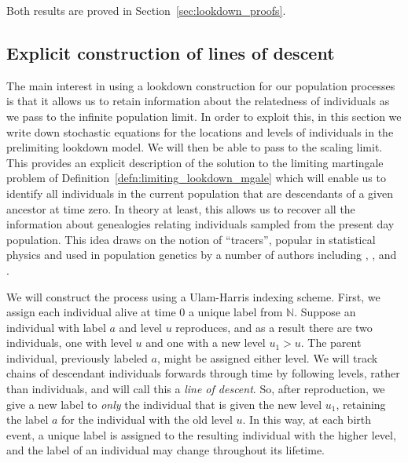 \documentclass[EJP]{ejpecp} %
\newcommand{\IN}{\mathbb N}
\newcommand{\citet}[1]{\cite{#1}}
\begin{document}
Both results are proved in Section~\ref{sec:lookdown_proofs}.

\subsection{Explicit construction of lines of descent}
    \label{sec: individual lines of descent}

 
The main interest in using a lookdown construction for our population
processes is that it allows us to retain information about the 
relatedness of individuals as we pass to the infinite population limit.
In order to exploit this, in this section we write down stochastic 
equations for the locations and levels of individuals in the prelimiting lookdown model.
We will then be able to pass to the scaling limit.
This provides an explicit description of the solution to
the limiting martingale problem of Definition~\ref{defn:limiting_lookdown_mgale}
which will enable us to identify all 
individuals in the current population that are descendants of a
given ancestor at time zero. In theory at least, this allows us to
recover all the information about genealogies relating individuals 
sampled from the present day population. This idea draws on the notion
of ``tracers'', popular in statistical physics and used in population
genetics by a number of authors including 
\citet{hallatschek/nelson:2008}, \citet{durrett/fan:2016}, and \citet{biswas/etheridge/klimek:2018}.

We will construct the process using a Ulam-Harris indexing scheme.
First, we assign each individual alive at time 0 a unique label from $\IN$.
Suppose an individual with label $a$ and level $u$ reproduces,
and as a result there are two individuals, one with level $u$ and one with a new level $u_1 > u$.
The parent individual, previously labeled $a$, might be assigned either level.
We will track chains of descendant individuals forwards through time by
following levels, rather than individuals, and will call this a \emph{line of descent}.
So, after reproduction, we give a new label to \emph{only} the individual
that is given the new level $u_1$,
retaining the label $a$ for the individual with the old level $u$.
In this way, at each birth event, a unique label is 
assigned to the resulting individual with the higher level,
and the label of an individual may change throughout its lifetime.
\end{document}
